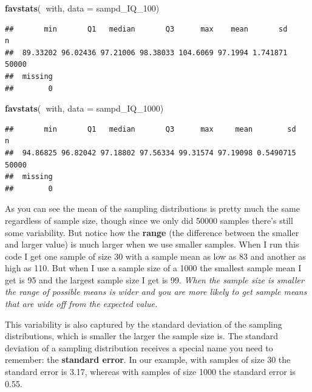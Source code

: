 \documentclass[]{book}
\newenvironment{Shaded}{\begin{snugshade}}{\end{snugshade}}
\newcommand{\DataTypeTok}[1]{\textcolor[rgb]{0.13,0.29,0.53}{#1}}
\newcommand{\DecValTok}[1]{\textcolor[rgb]{0.00,0.00,0.81}{#1}}
\newcommand{\KeywordTok}[1]{\textcolor[rgb]{0.13,0.29,0.53}{\textbf{#1}}}
\newcommand{\NormalTok}[1]{#1}
\newcommand{\OperatorTok}[1]{\textcolor[rgb]{0.81,0.36,0.00}{\textbf{#1}}}
\theoremstyle{definition}
\theoremstyle{definition}
\theoremstyle{definition}
\theoremstyle{remark}
\begin{document}
\begin{Shaded}
\begin{Highlighting}[]
\KeywordTok{favstats}\NormalTok{(}\OperatorTok{~}\NormalTok{with, }\DataTypeTok{data =}\NormalTok{ sampd_IQ_}\DecValTok{100}\NormalTok{)}
\end{Highlighting}
\end{Shaded}

\begin{verbatim}
##       min       Q1   median       Q3      max    mean       sd     n
##  89.33202 96.02436 97.21006 98.38033 104.6069 97.1994 1.741871 50000
##  missing
##        0
\end{verbatim}

\begin{Shaded}
\begin{Highlighting}[]
\KeywordTok{favstats}\NormalTok{(}\OperatorTok{~}\NormalTok{with, }\DataTypeTok{data =}\NormalTok{ sampd_IQ_}\DecValTok{1000}\NormalTok{)}
\end{Highlighting}
\end{Shaded}

\begin{verbatim}
##       min       Q1   median       Q3      max     mean        sd     n
##  94.86825 96.82042 97.18802 97.56334 99.31574 97.19098 0.5490715 50000
##  missing
##        0
\end{verbatim}

As you can see the mean of the sampling distributions is pretty much the
same regardless of sample size, though since we only did 50000 samples
there's still some variability. But notice how the \textbf{range} (the
difference between the smaller and larger value) is much larger when we
use smaller samples. When I run this code I get one sample of size 30
with a sample mean as low as 83 and another as high as 110. But when I
use a sample size of a 1000 the smallest sample mean I get is 95 and the
largest sample size I get is 99. \emph{When the sample size is smaller
the range of possible means is wider and you are more likely to get
sample means that are wide off from the expected value.}

This variability is also captured by the standard deviation of the
sampling distributions, which is smaller the larger the sample size is.
The standard deviation of a sampling distribution receives a special
name you need to remember: the \textbf{standard error}. In our example,
with samples of size 30 the standard error is 3.17, whereas with samples
of size 1000 the standard error is 0.55.
\end{document}
